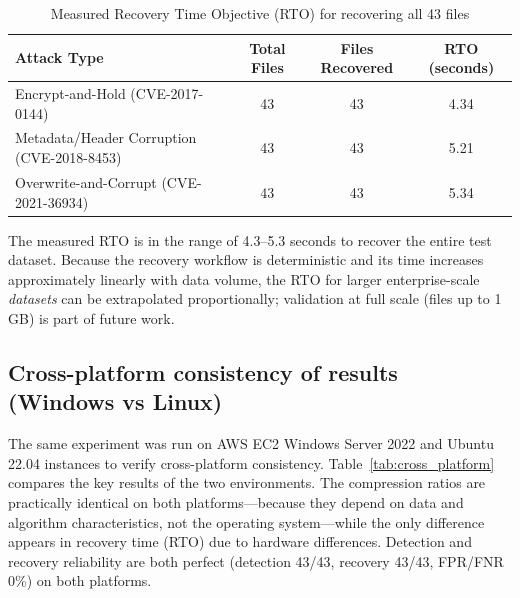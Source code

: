 \documentclass{iaesarticle}
\begin{document}
\begin{table}[H]
\centering
\fontsize{8pt}{10pt}\selectfont
\caption{Measured Recovery Time Objective (RTO) for recovering all 43 files}
\label{tab:rto}
\begin{tabular}{l c c c}
\hline
\textbf{Attack Type} & \textbf{Total Files} & \textbf{Files Recovered} & \textbf{RTO (seconds)} \\
\hline
Encrypt-and-Hold (CVE-2017-0144)        & 43 & 43 & 4.34 \\
Metadata/Header Corruption (CVE-2018-8453) & 43 & 43 & 5.21 \\
Overwrite-and-Corrupt (CVE-2021-36934)  & 43 & 43 & 5.34 \\
\hline
\end{tabular}
\end{table}

The measured RTO is in the range of 4.3--5.3 seconds to recover the entire test dataset. Because the recovery workflow is deterministic and its time increases approximately linearly with data volume, the RTO for larger enterprise-scale \textit{datasets} can be extrapolated proportionally; validation at full scale (files up to 1 GB) is part of future work.

\subsection{Cross-platform consistency of results (Windows vs Linux)}
The same experiment was run on AWS EC2 Windows Server 2022 and Ubuntu 22.04 instances to verify cross-platform consistency. Table~\ref{tab:cross_platform} compares the key results of the two environments. The compression ratios are practically identical on both platforms---because they depend on data and algorithm characteristics, not the operating system---while the only difference appears in recovery time (RTO) due to hardware differences. Detection and recovery reliability are both perfect (detection 43/43, recovery 43/43, FPR/FNR 0\%) on both platforms.
\end{document}
